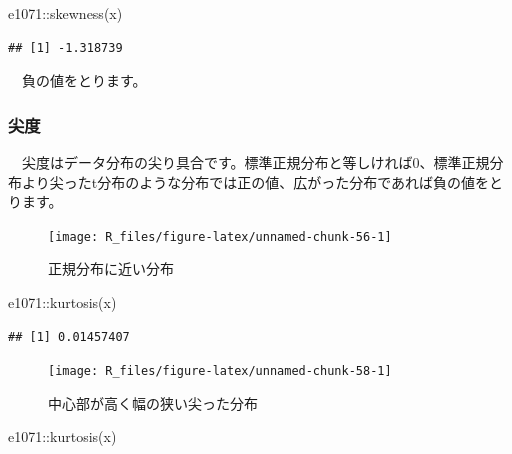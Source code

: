 \documentclass[
  12pt,
]{book}
\newenvironment{Shaded}{\begin{snugshade}}{\end{snugshade}}
\newcommand{\FunctionTok}[1]{\textcolor[rgb]{0.00,0.00,0.00}{#1}}
\newcommand{\NormalTok}[1]{#1}
\newcommand{\SpecialCharTok}[1]{\textcolor[rgb]{0.00,0.00,0.00}{#1}}
\begin{document}
\begin{Shaded}
\begin{Highlighting}[numbers=left,,]
\NormalTok{e1071}\SpecialCharTok{::}\FunctionTok{skewness}\NormalTok{(x)}
\end{Highlighting}
\end{Shaded}

\begin{verbatim}
## [1] -1.318739
\end{verbatim}

　負の値をとります。

\hypertarget{ux5c16ux5ea6}{%
\subsubsection*{\texorpdfstring{尖度}{尖度}}\label{ux5c16ux5ea6}}

　尖度はデータ分布の尖り具合です。標準正規分布と等しければ\(0\)、標準正規分布より尖ったt分布のような分布では正の値、広がった分布であれば負の値をとります。

\begin{figure}[H]

{\centering \texttt{[image: R\_files/figure-latex/unnamed-chunk-56-1]} 

}

\caption{正規分布に近い分布}\label{fig:unnamed-chunk-56}
\end{figure}

\begin{Shaded}
\begin{Highlighting}[numbers=left,,]
\NormalTok{e1071}\SpecialCharTok{::}\FunctionTok{kurtosis}\NormalTok{(x)}
\end{Highlighting}
\end{Shaded}

\begin{verbatim}
## [1] 0.01457407
\end{verbatim}

\begin{figure}[H]

{\centering \texttt{[image: R\_files/figure-latex/unnamed-chunk-58-1]} 

}

\caption{中心部が高く幅の狭い尖った分布}\label{fig:unnamed-chunk-58}
\end{figure}

\begin{Shaded}
\begin{Highlighting}[numbers=left,,]
\NormalTok{e1071}\SpecialCharTok{::}\FunctionTok{kurtosis}\NormalTok{(x)}
\end{Highlighting}
\end{Shaded}
\end{document}
